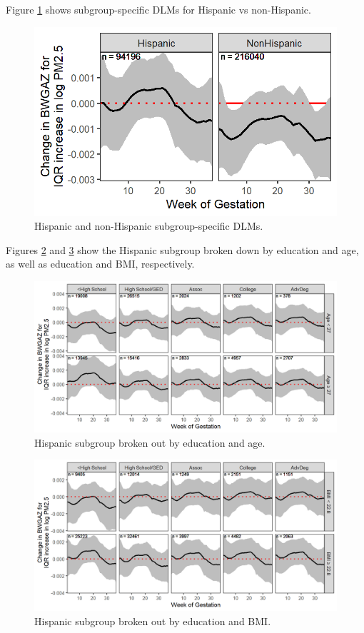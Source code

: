 \documentclass[12pt]{article}
\begin{document}
Figure \ref{fig:hisp-nonhisp} shows subgroup-specific DLMs for Hispanic vs non-Hispanic.
\begin{figure}[!ht]
    \centering
    \includegraphics[width=.5\textwidth]{supp-img/bwgaz_hisp_nonhisp.png}
    \caption{Hispanic and non-Hispanic subgroup-specific DLMs.}
    \label{fig:hisp-nonhisp}
\end{figure}

Figures \ref{fig:hisp-educ-age} and \ref{fig:hisp-educ-bmi} show the Hispanic subgroup broken down by education and age, as well as education and BMI, respectively.
\begin{figure}[!ht]
    \centering
    \includegraphics[width=.9\textwidth]{supp-img/hisp_educ_age.png} 
    \caption{Hispanic subgroup broken out by education and age.}
    \label{fig:hisp-educ-age}
\end{figure}
\begin{figure}[!ht]
    \centering
    \includegraphics[width=.9\textwidth]{supp-img/hisp_educ_bmi.png}
    \caption{Hispanic subgroup broken out by education and BMI.}
    \label{fig:hisp-educ-bmi}
\end{figure}
\end{document}
